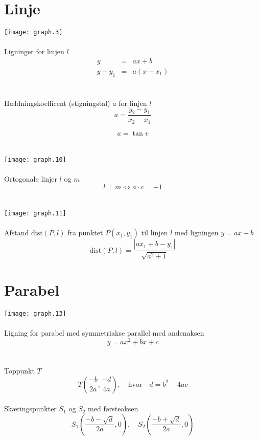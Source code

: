 \documentclass[11pt,a5paper,fleqn,leqno]{book}
\begin{document}
\vfill

\section{Linje}

\texttt{[image: graph.3]}
\\
\\
Ligninger for linjen $l$
\begin{eqnarray}
y & = & ax+b \\
y-y_1 & = & a(x-x_1) \nonumber
\end{eqnarray}
\\
\\
Hældningskoefficent (stigningstal) $a$ for linjen $l$
\begin{equation}
a = \frac{y_2 - y_1}{x_2 - x_1}
\end{equation}

\begin{equation}
a = \tan v
\end{equation}
\\
\\
\texttt{[image: graph.10]}
\\
\\
Ortogonale linjer $l$ og $m$
\begin{equation}
l \perp m \Leftrightarrow a \cdot c = -1
\end{equation}
\\
\\
\texttt{[image: graph.11]}
\\
\\
Afstand $\text{dist}(P,l)$ fra punktet $P(x_1,y_1)$ til linjen $l$ med ligningen $y = ax+b$
\begin{equation}
\text{dist}(P,l) = \frac{|ax_1 + b - y_1|}{\sqrt{a^2 + 1}}
\end{equation}

\vfill

\section{Parabel}

\texttt{[image: graph.13]}
\\
\\
Ligning for parabel med symmetriakse parallel med andenaksen
\begin{equation}
y = ax^2 + bx +c
\end{equation}
\\
\\
Toppunkt $T$
\begin{equation}
T\left(\frac{-b}{2a}, \frac{-d}{4a}\right), \quad \text{hvor} \quad d = b^2 - 4ac
\end{equation}
\\
Skæringspunkter $S_1$ og $S_2$ med førsteaksen
\begin{equation}
S_1\left(\frac{-b - \sqrt{d}}{2a}, 0\right), \quad S_2\left(\frac{-b + \sqrt{d}}{2a}, 0\right)
\end{equation}
\end{document}
